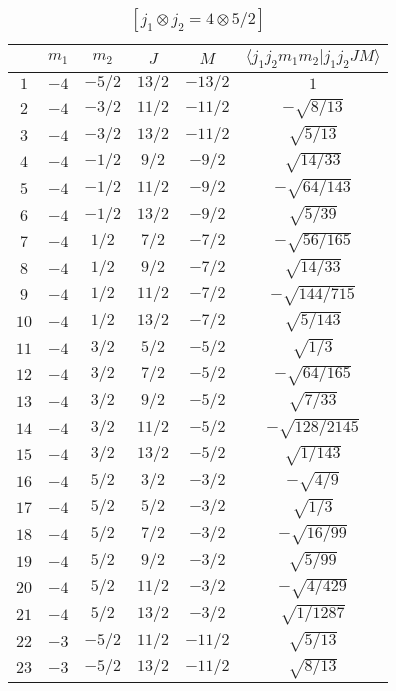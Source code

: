 \begin{table}
\tiny
\caption{$[j_1 \otimes j_2 = 4 \otimes 5/2]$}
\begin{center}
\begin{tabular}{|c|c|c|c|c|c|}
\hline 
   & $m_1$ & $m_2$ & $J$ & $M$ & $\langle j_1 j_2 m_1 m_2 | j_1 j_2 J M \rangle$ \\ 
\hline 
$1$ & $-4$ & $-5/2$ & $13/2$ & $-13/2$ & $1$ \\ 
$2$ & $-4$ & $-3/2$ & $11/2$ & $-11/2$ & $-\sqrt{8/13}$ \\ 
$3$ & $-4$ & $-3/2$ & $13/2$ & $-11/2$ & $\sqrt{5/13}$ \\ 
$4$ & $-4$ & $-1/2$ & $9/2$ & $-9/2$ & $\sqrt{14/33}$ \\ 
$5$ & $-4$ & $-1/2$ & $11/2$ & $-9/2$ & $-\sqrt{64/143}$ \\ 
$6$ & $-4$ & $-1/2$ & $13/2$ & $-9/2$ & $\sqrt{5/39}$ \\ 
$7$ & $-4$ & $1/2$ & $7/2$ & $-7/2$ & $-\sqrt{56/165}$ \\ 
$8$ & $-4$ & $1/2$ & $9/2$ & $-7/2$ & $\sqrt{14/33}$ \\ 
$9$ & $-4$ & $1/2$ & $11/2$ & $-7/2$ & $-\sqrt{144/715}$ \\ 
$10$ & $-4$ & $1/2$ & $13/2$ & $-7/2$ & $\sqrt{5/143}$ \\ 
$11$ & $-4$ & $3/2$ & $5/2$ & $-5/2$ & $\sqrt{1/3}$ \\ 
$12$ & $-4$ & $3/2$ & $7/2$ & $-5/2$ & $-\sqrt{64/165}$ \\ 
$13$ & $-4$ & $3/2$ & $9/2$ & $-5/2$ & $\sqrt{7/33}$ \\ 
$14$ & $-4$ & $3/2$ & $11/2$ & $-5/2$ & $-\sqrt{128/2145}$ \\ 
$15$ & $-4$ & $3/2$ & $13/2$ & $-5/2$ & $\sqrt{1/143}$ \\ 
$16$ & $-4$ & $5/2$ & $3/2$ & $-3/2$ & $-\sqrt{4/9}$ \\ 
$17$ & $-4$ & $5/2$ & $5/2$ & $-3/2$ & $\sqrt{1/3}$ \\ 
$18$ & $-4$ & $5/2$ & $7/2$ & $-3/2$ & $-\sqrt{16/99}$ \\ 
$19$ & $-4$ & $5/2$ & $9/2$ & $-3/2$ & $\sqrt{5/99}$ \\ 
$20$ & $-4$ & $5/2$ & $11/2$ & $-3/2$ & $-\sqrt{4/429}$ \\ 
$21$ & $-4$ & $5/2$ & $13/2$ & $-3/2$ & $\sqrt{1/1287}$ \\ 
$22$ & $-3$ & $-5/2$ & $11/2$ & $-11/2$ & $\sqrt{5/13}$ \\ 
$23$ & $-3$ & $-5/2$ & $13/2$ & $-11/2$ & $\sqrt{8/13}$ \\ 

\end{tabular}
\end{center}
\end{table}
